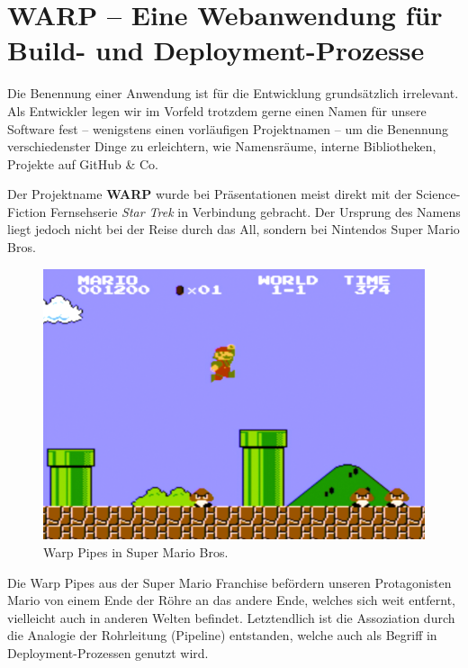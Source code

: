 
\chapter{WARP – Eine Webanwendung für Build- und Deployment-Prozesse}

Die Benennung einer Anwendung ist für die Entwicklung grundsätzlich irrelevant. Als Entwickler legen wir im Vorfeld trotzdem gerne einen Namen für unsere Software fest – wenigstens einen vorläufigen Projektnamen – um die Benennung verschiedenster Dinge zu erleichtern, wie Namensräume, interne Bibliotheken, Projekte auf GitHub \& Co.

Der Projektname \textbf{WARP} wurde bei Präsentationen meist direkt mit der Science-Fiction Fernsehserie \emph{Star Trek} in Verbindung gebracht. Der Ursprung des Namens liegt jedoch nicht bei der Reise durch das All, sondern bei Nintendos Super Mario Bros.

\begin{figure}[h]
  \caption{Warp Pipes in Super Mario Bros.}
  \label{fig:super-mario-warp-pipes}
  \centering
    \includegraphics[width=.5\textwidth]{assets/mario-pipes}
\end{figure}

Die Warp Pipes aus der Super Mario Franchise befördern unseren Pro\-ta\-go\-nisten Mario von einem Ende der Röhre an das andere Ende, welches sich weit entfernt, vielleicht auch in anderen Welten befindet. Letztendlich ist die Assoziation durch die Analogie der Rohrleitung (Pipeline) entstanden, welche auch als Begriff in Deployment-Prozessen genutzt wird.


